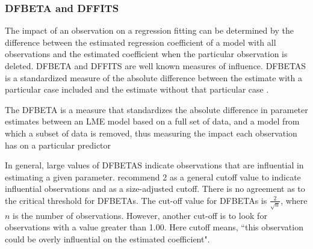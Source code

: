 \documentclass[12pt, a4paper]{report}
\theoremstyle{plain}
\theoremstyle{definition}
\theoremstyle{remark}
\begin{document}
\subsubsection{DFBETA and DFFITS}
	The impact of an observation on a regression fitting can be determined by the difference between the estimated regression coefficient of a model with all observations and the estimated coefficient when the particular observation is deleted. 	DFBETA and DFFITS are well known measures of influence.  DFBETAS is a standardized measure of the absolute difference between the estimate with a particular
	case included and the estimate without that particular case \citep{belsley2005}.

	
	
The DFBETA is a measure that standardizes the absolute difference in parameter estimates between an LME model based on a full set of data, and a model from which a subset of data is removed, thus measuring the impact each observation has on a particular predictor

%
%	
 
	
In general, large values of DFBETAS indicate observations that are influential in estimating a given parameter. \citet{belsley2005} recommend 2 as a general cutoff value to indicate influential observations and as a size-adjusted cutoff. There is no agreement as to the critical threshold for DFBETAs. The cut-off value for DFBETAs is $\frac{2}{\sqrt{n}}$, where $n$ is the number of observations. However, another cut-off is to look for observations with a value greater than 1.00. Here cutoff means,
``this observation could be overly influential on the estimated coefficient".
		

	
	
	
	
\end{document}
